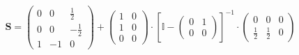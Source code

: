 \documentclass[10pt]{article} \usepackage{amsmath} \usepackage{bbold}
\begin{document}
\[ \mathbf{S} = \left(\begin{smallmatrix} 0 & 0 & \frac{1}{2} \\ 0 & 0
& -\frac{1}{2} \\ 1 & -1 & 0 \end{smallmatrix}\right) +
\left(\begin{smallmatrix} 1 & 0 \\ 1 & 0 \\ 0 & 0
\end{smallmatrix}\right) \cdot \left[ \mathbb{I}  -
\left(\begin{smallmatrix} 0 & 1 \\ 0 & 0 \end{smallmatrix}\right)
\right]^{-1} \cdot\left(\begin{smallmatrix} 0 & 0 & 0 \\ \frac{1}{2} &
\frac{1}{2} & 0 \end{smallmatrix}\right) \]
\end{document}
